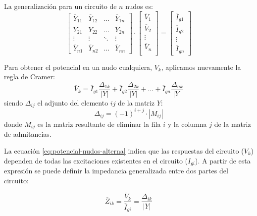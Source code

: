 La generalización para un circuito de $n$ nudos es:
\begin{equation*}
  \begin{bmatrix}
    \overline{Y}_{11} & \overline{Y}_{12} & \dots & \overline{Y}_{1n} \\
    \overline{Y}_{21} & \overline{Y}_{22} & \dots & \overline{Y}_{2n} \\
    \vdots & \vdots & \ddots & \vdots \\
    \overline{Y}_{n1} & \overline{Y}_{n2} &  \dots & \overline{Y}_{nn}
  \end{bmatrix} \cdot %
  \begin{bmatrix}
    \overline{V}_1\\
    \overline{V}_2\\
    \vdots \\
    \overline{V}_n\\
  \end{bmatrix} = %
  \begin{bmatrix}
    \overline{I}_{g1}\\
    \overline{I}_{g2}\\
    \vdots \\
    \overline{I}_{gn}
  \end{bmatrix}
\end{equation*}

Para obtener el potencial en un nudo cualquiera, $V_k$, aplicamos nuevamente la regla de Cramer:
\begin{equation}
  \label{eq:potencial-nudos-alterna}
  \overline{V}_k = \overline{I}_{g1} \frac{\Delta_{1k}}{|Y|} + \overline{I}_{g2} \frac{\Delta_{2k}}{|Y|} + \dots + \overline{I}_{gn} \frac{\Delta_{nk}}{|Y|}
\end{equation}
siendo \(\Delta_{ij}\) el adjunto del elemento \(ij\) de la matriz \(Y\):
\[
  \Delta_{ij} = (-1)^{i+j} \cdot |M_{ij}|
\]
donde \(M_{ij}\) es la matriz resultante de eliminar la fila \(i\) y la columna \(j\) de la matriz de admitancias.

La ecuación \ref{eq:potencial-nudos-alterna} indica que las respuestas del circuito (\(V_k\)) dependen de todas las excitaciones existentes en el circuito (\(I_{gi}\)). A partir de esta expresión se puede definir la impedancia generalizada entre dos partes del circuito:

\begin{equation}
  \label{eq:impedancia-generalizada}
  \overline{Z}_{ik} = \frac{\overline{V}_k}{\overline{I}_{gi}} = \frac{\Delta_{ik}}{|Y|}
\end{equation}

